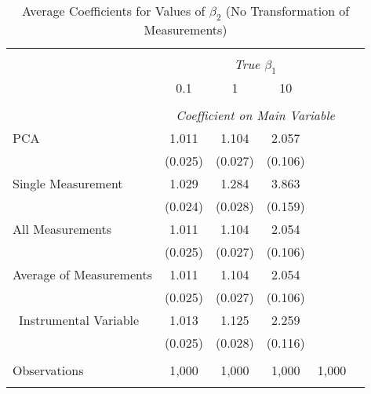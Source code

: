 \begin{table}[!htbp] \centering
  \caption{Average Coefficients for Values of $\beta_2$ (No Transformation of Measurements) \label{sim_beta2_5_noexp}}
\begin{tabular}{@{\extracolsep{5pt}}lccccc}
\\[-1.8ex]\hline
\hline \\[-1.8ex]
& \multicolumn{4}{c}{\textit{True $\beta_1$}} \
\cr \
\\[-1.8ex] & 0.1 & 1 & 10\\
\hline \\[-1.8ex]
& \multicolumn{4}{c}{\textit{Coefficient on Main Variable}} \\
 PCA & 1.011 & 1.104 & 2.057  \\
  & (0.025) & (0.027) & (0.106)\\
  Single Measurement & 1.029 & 1.284 & 3.863  \\
& (0.024) & (0.028) & (0.159)\\
 All Measurements & 1.011 & 1.104 & 2.054  \\
  & (0.025) & (0.027) & (0.106)\\
 Average of Measurements & 1.011 & 1.104 & 2.054  \\
  & (0.025) & (0.027) & (0.106)\\\
  Instrumental Variable & 1.013 & 1.125 & 2.259 \\
& (0.025) & (0.028) & (0.116) \\

\hline \\[-1.8ex]
 Observations & 1,000 & 1,000 & 1,000 & 1,000 &\\
\hline
\hline \\[-1.8ex]
\end{tabular}
\end{table}